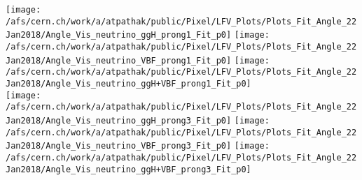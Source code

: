 \documentclass{beamer}
\begin{document}
\begin{frame}
\begin{normalsize}
\begin{center}
\texttt{[image: /afs/cern.ch/work/a/atpathak/public/Pixel/LFV\_Plots/Plots\_Fit\_Angle\_22Jan2018/Angle\_Vis\_neutrino\_ggH\_prong1\_Fit\_p0]}
\texttt{[image: /afs/cern.ch/work/a/atpathak/public/Pixel/LFV\_Plots/Plots\_Fit\_Angle\_22Jan2018/Angle\_Vis\_neutrino\_VBF\_prong1\_Fit\_p0]}
\texttt{[image: /afs/cern.ch/work/a/atpathak/public/Pixel/LFV\_Plots/Plots\_Fit\_Angle\_22Jan2018/Angle\_Vis\_neutrino\_ggH+VBF\_prong1\_Fit\_p0]}\\
\texttt{[image: /afs/cern.ch/work/a/atpathak/public/Pixel/LFV\_Plots/Plots\_Fit\_Angle\_22Jan2018/Angle\_Vis\_neutrino\_ggH\_prong3\_Fit\_p0]}
\texttt{[image: /afs/cern.ch/work/a/atpathak/public/Pixel/LFV\_Plots/Plots\_Fit\_Angle\_22Jan2018/Angle\_Vis\_neutrino\_VBF\_prong3\_Fit\_p0]}
\texttt{[image: /afs/cern.ch/work/a/atpathak/public/Pixel/LFV\_Plots/Plots\_Fit\_Angle\_22Jan2018/Angle\_Vis\_neutrino\_ggH+VBF\_prong3\_Fit\_p0]}\\
\end{center}
\end{normalsize}
\end {frame}
\end{document}
